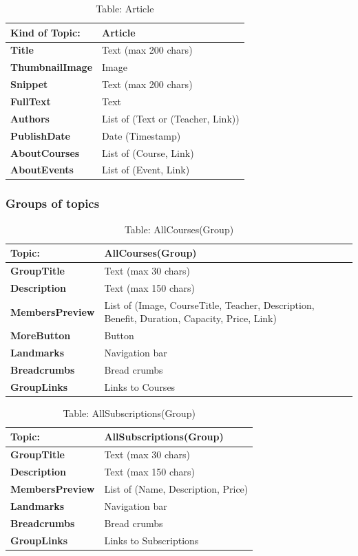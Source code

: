 \begin{table}[H]
\centering
\begin{tabularx}{\textwidth}{|>{\bfseries}l|X|}
\hline
Kind of Topic: & \textbf{Article} \\
\hline
Title & Text (max 200 chars) \\
\hline
ThumbnailImage & Image \\
\hline
Snippet & Text (max 200 chars) \\
\hline
FullText & Text \\
\hline
Authors & List of (Text or (Teacher, Link)) \\
\hline
PublishDate & Date (Timestamp) \\
\hline
AboutCourses & List of (Course, Link) \\
\hline
AboutEvents & List of (Event, Link) \\
\hline
\end{tabularx}
\caption{Table: Article}
\end{table}

\subsubsection{Groups of topics}

\begin{table}[H]
\centering
\begin{tabularx}{\textwidth}{|>{\bfseries}l|X|}
\hline
Topic: & \textbf{AllCourses(Group)} \\
\hline
GroupTitle & Text (max 30 chars) \\
\hline
Description & Text (max 150 chars) \\
\hline
MembersPreview & List of (Image, CourseTitle, Teacher, Description, Benefit, Duration, Capacity, Price, Link) \\
\hline
MoreButton & Button \\
\hline
Landmarks & Navigation bar \\
\hline
Breadcrumbs & Bread crumbs \\
\hline
GroupLinks & Links to Courses \\
\hline
\end{tabularx}
\caption{Table: AllCourses(Group)}
\end{table}

\begin{table}[H]
\centering
\begin{tabularx}{\textwidth}{|>{\bfseries}l|X|}
\hline
Topic: & \textbf{AllSubscriptions(Group)} \\
\hline
GroupTitle & Text (max 30 chars) \\
\hline
Description & Text (max 150 chars) \\
\hline
MembersPreview & List of (Name, Description, Price) \\
\hline
Landmarks & Navigation bar \\
\hline
Breadcrumbs & Bread crumbs \\
\hline
GroupLinks & Links to Subscriptions \\
\hline
\end{tabularx}
\caption{Table: AllSubscriptions(Group)}
\end{table}

